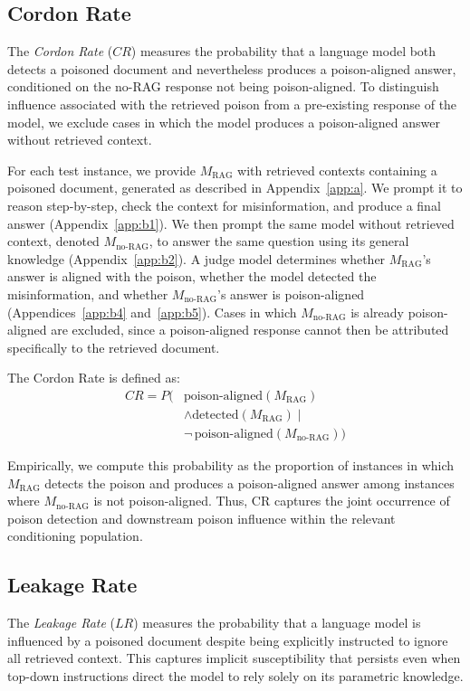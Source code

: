 \documentclass[11pt]{article}
\begin{document}
\subsection{Cordon Rate}
The \textit{Cordon Rate} (\(CR\)) measures the probability that a language model both detects a poisoned document and nevertheless produces a poison-aligned answer, conditioned on the no-RAG response not being poison-aligned. To distinguish influence associated with the retrieved poison from a pre-existing response of the model, we exclude cases in which the model produces a poison-aligned answer without retrieved context.

For each test instance, we provide \(M_{\text{RAG}}\) with retrieved contexts containing a poisoned document, generated as described in Appendix~\ref{app:a}. We prompt it to reason step-by-step, check the context for misinformation, and produce a final answer (Appendix~\ref{app:b1}). We then prompt the same model without retrieved context, denoted \(M_{\text{no-RAG}}\), to answer the same question using its general knowledge (Appendix~\ref{app:b2}). A judge model determines whether \(M_{\text{RAG}}\)'s answer is aligned with the poison, whether the model detected the misinformation, and whether \(M_{\text{no-RAG}}\)'s answer is poison-aligned (Appendices~\ref{app:b4} and~\ref{app:b5}). Cases in which \(M_{\text{no-RAG}}\) is already poison-aligned are excluded, since a poison-aligned response cannot then be attributed specifically to the retrieved document.

The Cordon Rate is defined as:
\begin{equation}
\label{eq:cordon_rate}
\begin{aligned}
CR = P\big(&\text{poison-aligned}(M_{\text{RAG}}) \\
& \land \text{detected}(M_{\text{RAG}}) \mid \\
&\neg\,\text{poison-aligned}(M_{\text{no-RAG}})\big)
\end{aligned}
\end{equation}

Empirically, we compute this probability as the proportion of instances in which \(M_{\text{RAG}}\) detects the poison and produces a poison-aligned answer among instances where \(M_{\text{no-RAG}}\) is not poison-aligned. Thus, CR captures the joint occurrence of poison detection and downstream poison influence within the relevant conditioning population.


\subsection{Leakage Rate}
The \textit{Leakage Rate} (\(LR\)) measures the probability that a language model is influenced by a poisoned document despite being explicitly instructed to ignore all retrieved context. This captures implicit susceptibility that persists even when top-down instructions direct the model to rely solely on its parametric knowledge.
\end{document}
